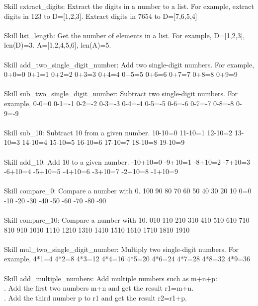 \documentclass{article} \usepackage{arxiv}
\begin{document}
\begin{tcolorbox}[title = {Skills for GSM8K}, colback = Apricot!25!white, colframe = BrickRed!75!black,fontupper =\fontsize{9pt}{9pt}\selectfont] 
Skill extract\_digits: Extract the digits in a number to a list. For example, extract digits in 123 to D=[1,2,3]. Extract digits in 7654 to D=[7,6,5,4] \\ \\

Skill list\_length: Get the number of elements in a list. For example, D=[1,2,3], len(D)=3. A=[1,2,4,5,6], len(A)=5. \\ \\

Skill add\_two\_single\_digit\_number: Add two single-digit numbers. For example, 0+0=0 0+1=1 0+2=2 0+3=3 0+4=4 0+5=5 0+6=6 0+7=7 0+8=8 0+9=9 \\ \\


Skill sub\_two\_single\_digit\_number: Subtract two single-digit numbers.  For example, 0-0=0 0-1=-1 0-2=-2 0-3=-3 0-4=-4 0-5=-5 0-6=-6 0-7=-7 0-8=-8 0-9=-9 \\ \\

Skill sub\_10: Subtract 10 from a given number. 10-10=0 11-10=1 12-10=2 13-10=3 14-10=4 15-10=5 16-10=6 17-10=7 18-10=8 19-10=9 \\ \\

Skill add\_10: Add 10 to a given number. -10+10=0 -9+10=1 -8+10=2 -7+10=3 -6+10=4 -5+10=5 -4+10=6 -3+10=7 -2+10=8 -1+10=9\\ \\

Skill compare\_0: Compare a number with 0.  100 90 80 70 60 50 40 30 20 10 0=0 -10 -20 -30 -40 -50 -60 -70 -80 -90 \\ \\

Skill compare\_10: Compare a number with 10.  010 110 210 310 410 510 610 710 810 910 1010 1110 1210 1310 1410 1510 1610 1710 1810 1910  \\ \\

Skill mul\_two\_single\_digit\_number: Multiply two single-digit numbers.  For example, 4*1=4 4*2=8 4*3=12 4*4=16 4*5=20 4*6=24 4*7=28 4*8=32 4*9=36 \\ \\


Skill add\_multiple\_numbers: Add multiple numbers such as m+n+p:  \\
. Add the first two numbers m+n and get the result r1=m+n. \\ 
. Add the third number p to r1 and get the result r2=r1+p.  \\ \\



\end{tcolorbox}
\end{document}
